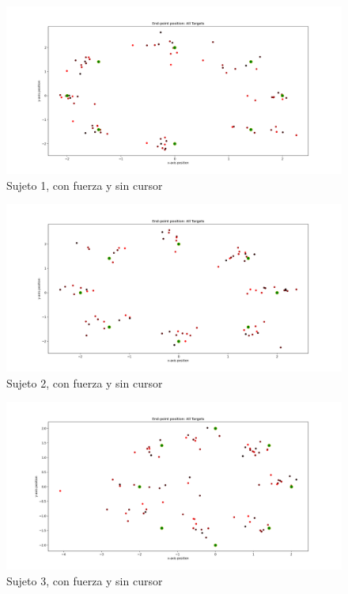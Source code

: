 \documentclass[a4paper,11pt, oneside]{book}
\begin{document}
\begin{figure}[H]
	\includegraphics[width=\linewidth]{sujeto1/force_no_cursor/trayectorias_puntos}
	\caption{Sujeto 1, con  fuerza y sin cursor}
	\label{1-4-1}
\end{figure}
\begin{figure}[H]
	\includegraphics[width=\linewidth]{sujeto2/force_no_cursor/trayectorias_puntos}
	\caption{Sujeto 2, con  fuerza y sin cursor}
	\label{2-4-1}
\end{figure}
\begin{figure}[H]
	\includegraphics[width=\linewidth]{sujeto3/force_no_cursor/trayectorias_puntos}
	\caption{Sujeto 3, con  fuerza y sin cursor}
	\label{3-4-1}
\end{figure}
\end{document}
